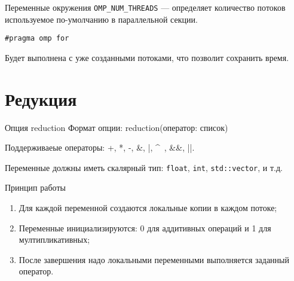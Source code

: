 \begin{frame}{Переменные окружения}
\texttt{OMP_NUM_THREADS} --- определяет количество потоков используемое по-умолчанию в параллельной секции.
\end{frame}

\begin{frame}[fragile]

\begin{lstlisting}
#pragma omp for
\end{lstlisting}

Будет выполнена с уже созданными потоками, что позволит сохранить время.

\end{frame}

\section{Редукция}

\begin{frame}{Опция reduction}
Формат опции: reduction(оператор: список)

\bigskip

Поддерживаеые операторы: +, *, -, \&, |, \^~, \&\&, ||.

\bigskip

Переменные должны иметь скалярный тип: \texttt{float}, \texttt{int},
\texttt{std::vector}, и т.д.
\end{frame}

\begin{frame}{Принцип работы}
\begin{enumerate}
    \item Для каждой переменной создаются локальные копии в каждом потоке;
    \item Переменные инициализируются: 0 для аддитивных операций и 1 для
    мултипликативных;
    \item После завершения надо локальными переменными выполняется заданный
    оператор.
\end{enumerate}
\end{frame}

